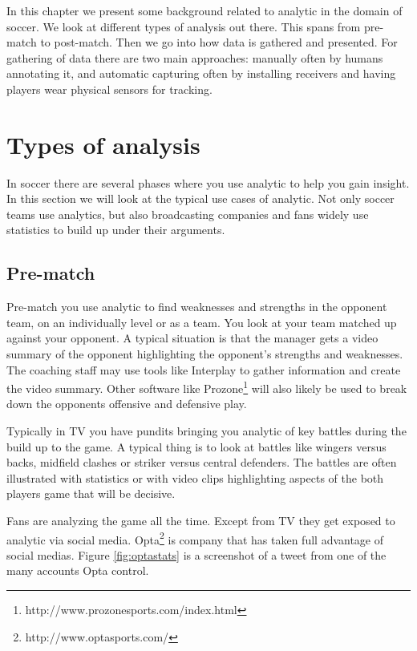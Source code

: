 In this chapter we present some background related to analytic in the domain of soccer. We look at different types of analysis out there. This spans from pre-match to post-match. Then we go into how data is gathered and presented. For gathering of data there are two main approaches: manually often by humans annotating it, and automatic capturing often by installing receivers and having players wear physical sensors for tracking.

\section{Types of analysis}

In soccer there are several phases where you use analytic to help you gain insight. In this section we will look at the typical use cases of analytic. Not only soccer teams use analytics, but also broadcasting companies and fans widely use statistics to build up under their arguments.

\subsection{Pre-match}

Pre-match you use analytic to find weaknesses and strengths in the opponent team, on an individually level or as a team. You look at your team matched up against your opponent. A typical situation is that the manager gets a video summary of the opponent highlighting the opponent’s strengths and weaknesses. The coaching staff may use tools like Interplay to gather information and create the video summary. Other software like Prozone\footnote{http://www.prozonesports.com/index.html} will also likely be used to break down the opponents offensive and defensive play. 

Typically in TV you have pundits bringing you analytic of key battles during the build up to the game. A typical thing is to look at battles like wingers versus backs, midfield clashes or striker versus central defenders. The battles are often illustrated with statistics or with video clips highlighting aspects of the both players game that will be decisive. 

Fans are analyzing the game all the time. Except from TV they get exposed to analytic via social media. Opta\footnote{http://www.optasports.com/} is company that has taken full advantage of social medias. Figure \ref{fig:optastats} is a screenshot of a tweet from one of the many accounts Opta control. 

